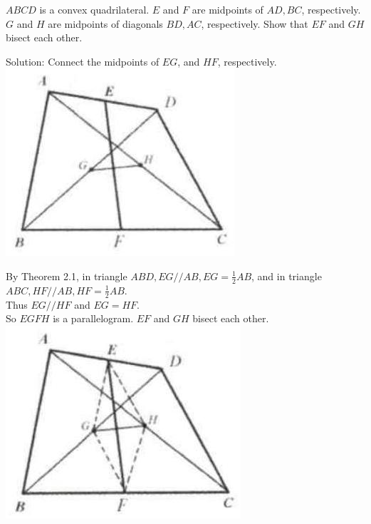 \documentclass{article}
\begin{document}
\(A B C D\) is a convex quadrilateral. \(E\) and \(F\) are midpoints of \(A D, B C\), respectively. \(G\) and \(H\) are midpoints of diagonals \(B D, A C\), respectively. Show that \(E F\) and \(G H\) bisect each other.

Solution:
Connect the midpoints of \(E G\), and \(H F\), respectively.\\
\centering
\includegraphics[width=\textwidth]{images/041(1).jpg}

By Theorem 2.1, in triangle \(A B D, E G / / A B, E G=\frac{1}{2} A B\), and in triangle \(A B C, H F / / A B, H F=\frac{1}{2} A B\).\\
Thus \(E G / / H F\) and \(E G=H F\).\\
So \(E G F H\) is a parallelogram. \(E F\) and \(G H\) bisect each other.\\
\centering
\includegraphics[width=\textwidth]{images/042(1).jpg}
\end{document}
